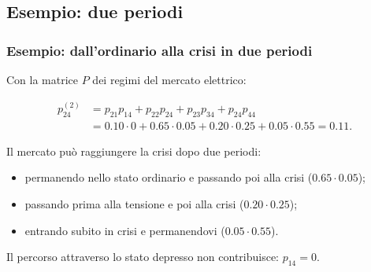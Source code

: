 \documentclass[handout]{beamer}%
\newenvironment{stepitemize}{\begin{itemize}[<+->]}{\end{itemize} }
\providecommand{\QTR}[2]{\csname #1\endcsname{#2}}
\begin{document}
\subsection{Esempio: due periodi}%

\begin{frame}%
%

\frametitle{Esempio: dall'ordinario alla crisi in due periodi}%
%

%


Con la matrice $P$ dei regimi del mercato elettrico:%

\[%
\begin{split}
p_{24}^{(2)}  & = p_{21}p_{14} + p_{22}p_{24} + p_{23}p_{34} + p_{24}p_{44}\\
& = 0.10\cdot0 + 0.65\cdot0.05 + 0.20\cdot0.25 + 0.05\cdot0.55 = 0.11.
\end{split}
\]


\medskip

Il mercato pu\`{o} raggiungere la crisi dopo due periodi:

\begin{stepitemize}
\item permanendo nello stato ordinario e passando poi alla crisi
($0.65\cdot0.05$);

\item passando prima alla tensione e poi alla crisi ($0.20\cdot0.25$);

\item entrando subito in crisi e permanendovi ($0.05\cdot0.55$).
\end{stepitemize}

\medskip

\begin{center}
{\small Il percorso attraverso lo stato depresso non contribuisce: $p_{14}%
=0$.}
\end{center}%

\transboxout
\end{frame}%
\end{document}
